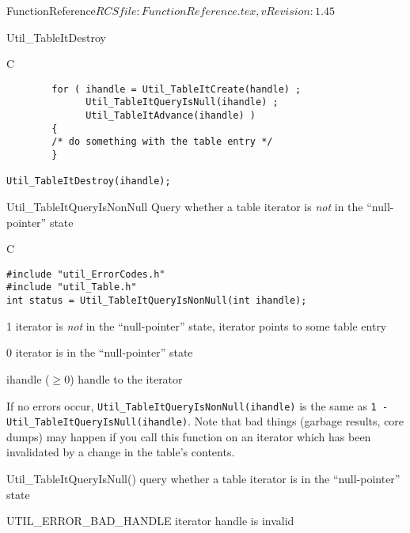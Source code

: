 \begin{cactuspart}{5}{FunctionReference}{$RCSfile: FunctionReference.tex,v $}{$Revision: 1.45 $}
\begin{FunctionDescription}{Util\_TableItDestroy}
\begin{Example}{C}
\begin{verbatim}
        for ( ihandle = Util_TableItCreate(handle) ;
              Util_TableItQueryIsNull(ihandle) ;
              Util_TableItAdvance(ihandle) )
        {
        /* do something with the table entry */
        }

Util_TableItDestroy(ihandle);
\end{verbatim}
\end{Example}
\end{FunctionDescription}


\begin{FunctionDescription}{Util\_TableItQueryIsNonNull}
\label{Util-TableItQueryIsNonNull}
Query whether a table iterator is {\em not\/} in the ``null-pointer'' state

\begin{Synopsis}{C}
\begin{verbatim}
#include "util_ErrorCodes.h"
#include "util_Table.h"
int status = Util_TableItQueryIsNonNull(int ihandle);
\end{verbatim}
\end{Synopsis}

\begin{Result}{\rm 1}
iterator is {\em not\/} in the ``null-pointer'' state,
\ie{} iterator points to some table entry
\end{Result}
\begin{Result}{\rm 0}
iterator is in the ``null-pointer'' state
\end{Result}

\begin{Parameter}{ihandle ($\ge 0$)}
handle to the iterator
\end{Parameter}

\begin{Discussion}
If no errors occur,
\verb|Util_TableItQueryIsNonNull(ihandle)|
is the same as
\verb|1 - Util_TableItQueryIsNull(ihandle)|.
\NewPar
Note that bad things (garbage results, core dumps) may happen if
you call this function on an iterator which has been invalidated
by a change in the table's contents.
\end{Discussion}

\begin{SeeAlso}{Util\_TableItQueryIsNull()}
query whether a table iterator is in the ``null-pointer'' state
\end{SeeAlso}

\begin{Error}{UTIL\_ERROR\_BAD\_HANDLE}
iterator handle is invalid
\end{Error}


\end{FunctionDescription}
\end{cactuspart}

